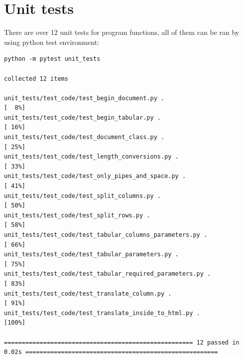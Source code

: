 \section{Unit tests}
There are over 12 unit tests  for program functions, all of them can be ran by using python test environment:
\begin{lstlisting}
python -m pytest unit_tests

collected 12 items                                                                                                            

unit_tests/test_code/test_begin_document.py .                                                                           [  8%]
unit_tests/test_code/test_begin_tabular.py .                                                                            [ 16%]
unit_tests/test_code/test_document_class.py .                                                                           [ 25%]
unit_tests/test_code/test_length_conversions.py .                                                                       [ 33%]
unit_tests/test_code/test_only_pipes_and_space.py .                                                                     [ 41%]
unit_tests/test_code/test_split_columns.py .                                                                            [ 50%]
unit_tests/test_code/test_split_rows.py .                                                                               [ 58%]
unit_tests/test_code/test_tabular_columns_parameters.py .                                                               [ 66%]
unit_tests/test_code/test_tabular_parameters.py .                                                                       [ 75%]
unit_tests/test_code/test_tabular_required_parameters.py .                                                              [ 83%]
unit_tests/test_code/test_translate_column.py .                                                                         [ 91%]
unit_tests/test_code/test_translate_inside_to_html.py .                                                                 [100%]

===================================================== 12 passed in 0.02s ======================================================
\end{lstlisting}
